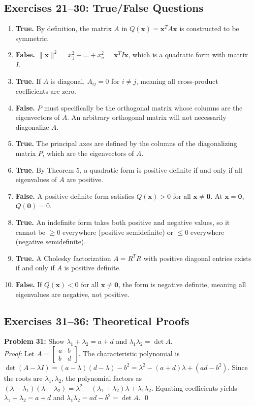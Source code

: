 \documentclass[11pt, letterpaper]{article}
\theoremstyle{definition}
\theoremstyle{remark}
\newcommand{\x}{\mathbf{x}}
\begin{document}
\subsection{Exercises 21--30: True/False Questions}
\begin{enumerate}[label=\textbf{\arabic*.}, start=21]
    \item \textbf{True.} By definition, the matrix $A$ in $Q(\x) = \x^T A \x$ is constructed to be symmetric.
    \item \textbf{False.} $\|\x\|^2 = x_1^2 + \dots + x_n^2 = \x^T I \x$, which is a quadratic form with matrix $I$.
    \item \textbf{True.} If $A$ is diagonal, $A_{ij} = 0$ for $i \neq j$, meaning all cross-product coefficients are zero.
    \item \textbf{False.} $P$ must specifically be the orthogonal matrix whose columns are the eigenvectors of $A$. An arbitrary orthogonal matrix will not necessarily diagonalize $A$.
    \item \textbf{True.} The principal axes are defined by the columns of the diagonalizing matrix $P$, which are the eigenvectors of $A$.
    \item \textbf{True.} By Theorem 5, a quadratic form is positive definite if and only if all eigenvalues of $A$ are positive.
    \item \textbf{False.} A positive definite form satisfies $Q(\x) > 0$ for all $\x \neq \mathbf{0}$. At $\x = \mathbf{0}$, $Q(\mathbf{0}) = 0$.
    \item \textbf{True.} An indefinite form takes both positive and negative values, so it cannot be $\ge 0$ everywhere (positive semidefinite) or $\le 0$ everywhere (negative semidefinite).
    \item \textbf{True.} A Cholesky factorization $A = R^T R$ with positive diagonal entries exists if and only if $A$ is positive definite.
    \item \textbf{False.} If $Q(\x) < 0$ for all $\x \neq \mathbf{0}$, the form is negative definite, meaning all eigenvalues are negative, not positive.
\end{enumerate}

\subsection{Exercises 31--36: Theoretical Proofs}

\textbf{Problem 31:} Show $\lambda_1 + \lambda_2 = a+d$ and $\lambda_1 \lambda_2 = \det A$. \\
\textit{Proof:} Let $A = \begin{bmatrix} a & b \\ b & d \end{bmatrix}$. The characteristic polynomial is $\det(A - \lambda I) = (a-\lambda)(d-\lambda) - b^2 = \lambda^2 - (a+d)\lambda + (ad-b^2)$. Since the roots are $\lambda_1, \lambda_2$, the polynomial factors as $(\lambda - \lambda_1)(\lambda - \lambda_2) = \lambda^2 - (\lambda_1 + \lambda_2)\lambda + \lambda_1 \lambda_2$. Equating coefficients yields $\lambda_1 + \lambda_2 = a+d$ and $\lambda_1 \lambda_2 = ad-b^2 = \det A$. \qed
\end{document}
